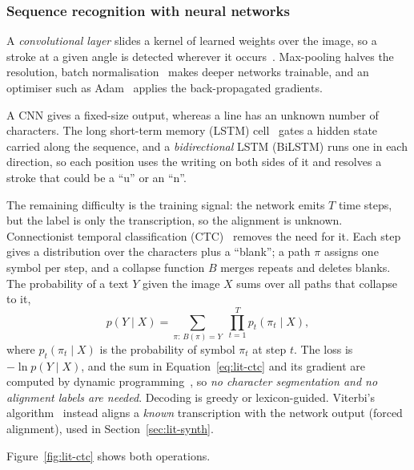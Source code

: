 \subsubsection{Sequence recognition with neural networks}
\label{sec:lit-nn}

A \emph{convolutional layer} slides a kernel of learned weights over the image, so a stroke at a given angle is detected wherever it occurs~\cite{lecun1998}. Max-pooling halves the resolution, batch normalisation~\cite{ioffe2015} makes deeper networks trainable, and an optimiser such as Adam~\cite{kingma2015} applies the back-propagated gradients.

A CNN gives a fixed-size output, whereas a line has an unknown number of characters. The long short-term memory (LSTM) cell~\cite{hochreiter1997} gates a hidden state carried along the sequence, and a \emph{bidirectional} LSTM (BiLSTM) runs one in each direction, so each position uses the writing on both sides of it and resolves a stroke that could be a ``u'' or an ``n''.

The remaining difficulty is the training signal: the network emits $T$ time steps, but the label is only the transcription, so the alignment is unknown. Connectionist temporal classification (CTC)~\cite{graves2006} removes the need for it. Each step gives a distribution over the characters plus a ``blank''; a path $\pi$ assigns one symbol per step, and a collapse function $B$ merges repeats and deletes blanks. The probability of a text $Y$ given the image $X$ sums over all paths that collapse to it,
\begin{equation}
p(Y\mid X)=\sum_{\pi:\,B(\pi)=Y}\;\prod_{t=1}^{T}p_t(\pi_t\mid X),
\label{eq:lit-ctc}
\end{equation}
where $p_t(\pi_t\mid X)$ is the probability of symbol $\pi_t$ at step $t$. The loss is $-\ln p(Y\mid X)$, and the sum in Equation~\ref{eq:lit-ctc} and its gradient are computed by dynamic programming~\cite{graves2006}, so \emph{no character segmentation and no alignment labels are needed}. Decoding is greedy or lexicon-guided. Viterbi's algorithm~\cite{viterbi1967} instead aligns a \emph{known} transcription with the network output (forced alignment), used in Section~\ref{sec:lit-synth}.

Figure~\ref{fig:lit-ctc} shows both operations.

